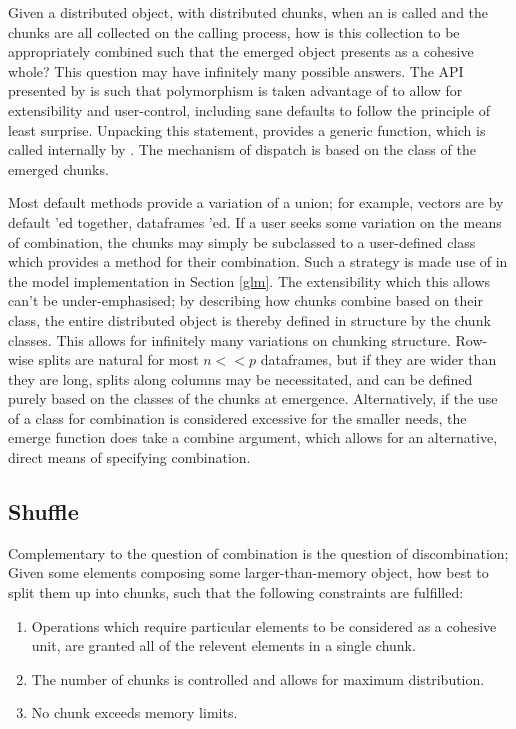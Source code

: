 Given a distributed object, with distributed chunks, when an  is called and the chunks are all collected on the calling process, how is this collection to be appropriately combined such that the emerged object presents as a cohesive whole?
This question may have infinitely many possible answers.
The API presented by \lsr is such that polymorphism is taken advantage of to allow for extensibility and user-control, including sane defaults to follow the principle of least surprise.
Unpacking this statement, \lsr provides a generic  function, which is called internally by .
The mechanism of dispatch is based on the class of the emerged chunks.

Most default  methods provide a variation of a union; for example, vectors are by default 'ed together, dataframes 'ed.
If a user seeks some variation on the means of combination, the chunks may simply be subclassed to a user-defined class which provides a  method for their combination.
Such a strategy is made use of in the model implementation in Section \cref{glm}.
The extensibility which this allows can't be under-emphasised; by describing how chunks combine based on their class, the entire distributed object is thereby defined in structure by the chunk classes.
This allows for infinitely many variations on chunking structure.
Row-wise splits are natural for most $n<<p$ dataframes, but if they are wider than they are long, splits along columns may be necessitated, and can be defined purely based on the classes of the chunks at emergence.
Alternatively, if the use of a class for combination is considered excessive for the smaller needs, the emerge function does take a combine argument, which allows for an alternative, direct means of specifying combination.

\subsection{Shuffle}\label{sec:shuffle}

Complementary to the question of combination is the question of discombination;
Given some elements composing some larger-than-memory object, how best to split them up into chunks, such that the following constraints are fulfilled:

\begin{enumerate}
\item Operations which require particular elements to be considered as a cohesive unit, are granted all of the relevent elements in a single chunk.
\item The number of chunks is controlled and allows for maximum distribution.
\item No chunk exceeds memory limits.
\end{enumerate}

